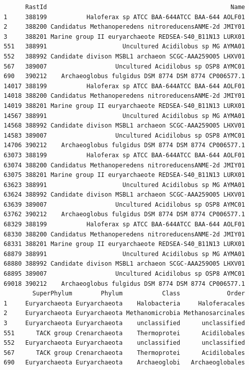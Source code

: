 \documentclass[12pt,twoside]{reedthesis}
\begin{document}
  \begin{verbatim}
        RastId                                                   Name
  1     388199           Haloferax sp ATCC BAA-644ATCC BAA-644 AOLF01
  2     388200 Candidatus Methanoperedens nitroreducensANME-2d JMIY01
  3     388201 Marine group II euryarchaeote REDSEA-S40_B11N13 LURX01
  551   388991                     Uncultured Acidilobus sp MG AYMA01
  552   388992 Candidate divison MSBL1 archaeon SCGC-AAA259O05 LHXV01
  567   389007                   Uncultured Acidilobus sp OSP8 AYMC01
  690   390212    Archaeoglobus fulgidus DSM 8774 DSM 8774 CP006577.1
  14017 388199           Haloferax sp ATCC BAA-644ATCC BAA-644 AOLF01
  14018 388200 Candidatus Methanoperedens nitroreducensANME-2d JMIY01
  14019 388201 Marine group II euryarchaeote REDSEA-S40_B11N13 LURX01
  14567 388991                     Uncultured Acidilobus sp MG AYMA01
  14568 388992 Candidate divison MSBL1 archaeon SCGC-AAA259O05 LHXV01
  14583 389007                   Uncultured Acidilobus sp OSP8 AYMC01
  14706 390212    Archaeoglobus fulgidus DSM 8774 DSM 8774 CP006577.1
  63073 388199           Haloferax sp ATCC BAA-644ATCC BAA-644 AOLF01
  63074 388200 Candidatus Methanoperedens nitroreducensANME-2d JMIY01
  63075 388201 Marine group II euryarchaeote REDSEA-S40_B11N13 LURX01
  63623 388991                     Uncultured Acidilobus sp MG AYMA01
  63624 388992 Candidate divison MSBL1 archaeon SCGC-AAA259O05 LHXV01
  63639 389007                   Uncultured Acidilobus sp OSP8 AYMC01
  63762 390212    Archaeoglobus fulgidus DSM 8774 DSM 8774 CP006577.1
  68329 388199           Haloferax sp ATCC BAA-644ATCC BAA-644 AOLF01
  68330 388200 Candidatus Methanoperedens nitroreducensANME-2d JMIY01
  68331 388201 Marine group II euryarchaeote REDSEA-S40_B11N13 LURX01
  68879 388991                     Uncultured Acidilobus sp MG AYMA01
  68880 388992 Candidate divison MSBL1 archaeon SCGC-AAA259O05 LHXV01
  68895 389007                   Uncultured Acidilobus sp OSP8 AYMC01
  69018 390212    Archaeoglobus fulgidus DSM 8774 DSM 8774 CP006577.1
          SuperPhylum        Phylum           Class             Order
  1     Euryarchaeota Euryarchaeota    Halobacteria     Haloferacales
  2     Euryarchaeota Euryarchaeota Methanomicrobia Methanosarcinales
  3     Euryarchaeota Euryarchaeota    unclassified      unclassified
  551      TACK group Crenarchaeota    Thermoprotei      Acidilobales
  552   Euryarchaeota Euryarchaeota    unclassified      unclassified
  567      TACK group Crenarchaeota    Thermoprotei      Acidilobales
  690   Euryarchaeota Euryarchaeota    Archaeoglobi   Archaeoglobales

\end{verbatim}
\end{document}
